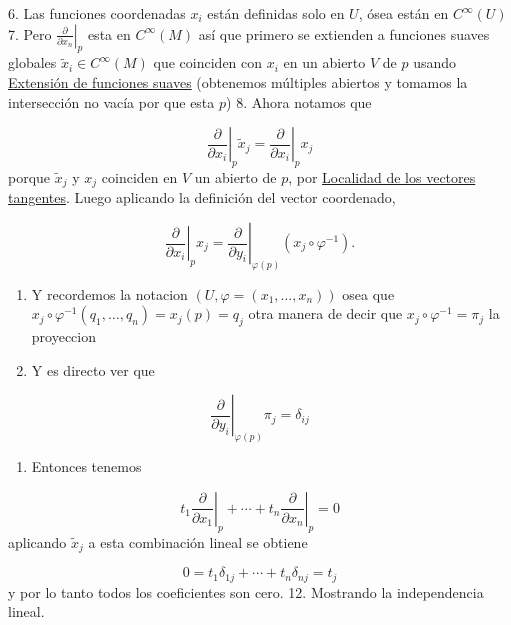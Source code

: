 \begin{bookproof}{}
6. Las funciones coordenadas $x_i$ están definidas solo en $U$, ósea están en $C^{\infty}(U)$ 7. Pero $\left.\frac{\partial}{\partial x_n}\right|_p$ esta en $C^{\infty}(M)$ así que primero se extienden a funciones suaves globales $\widetilde{x}_i\in C^\infty(M)$ que coinciden con $x_i$ en un abierto $V$ de $p$ usando \hyperref[blk:405b16]{Extensión de funciones suaves} (obtenemos múltiples abiertos y tomamos la intersección no vacía por que esta $p$) 8. Ahora notamos que

\[
\left.\frac{\partial}{\partial x_i}\right|_{p}\widetilde{x}_{j}=\left.\frac{\partial}{\partial x_i}\right|_{p}x_{j}
\]
porque $\widetilde{x}_{j}$ y $x_j$ coinciden en $V$ un abierto de $p$, por \hyperref[blk:b713ca]{Localidad de los vectores tangentes}. Luego aplicando la definición del vector coordenado,

\[
\left.\frac{\partial}{\partial x_i}\right|_{p}x_{j}=\left.\frac{\partial}{\partial y_i}\right|_{\varphi(p)}(x_{j}\circ\varphi^{-1}).
\]
\begin{enumerate}[start=9]
\item Y recordemos la notacion $(U,\varphi=(x_{1},\ldots,x_{n}))$ osea que $x_{j}\circ\varphi ^{-1}(q_{1},\ldots,q_{n})=x_{j}(p)=q_{j}$ otra manera de decir que $x_{j}\circ\varphi ^{-1}=\pi_{j}$ la proyeccion
\item Y es directo ver que
\end{enumerate}
\[
\left.\frac{\partial}{\partial y_i}\right|_{\varphi(p)}\pi_{j}=\delta_{ij}
\]
\begin{enumerate}[start=11]
\item Entonces tenemos
\end{enumerate}
\[
t_1\left.\frac{\partial}{\partial x_1}\right|_p+\cdots+t_n\left.\frac{\partial}{\partial x_n}\right|_p=0
\]
aplicando $\widetilde{x}_j$ a esta combinación lineal se obtiene

\[
0=t_1\delta_{1j}+\cdots+t_n\delta_{nj}=t_j
\]
y por lo tanto todos los coeficientes son cero. 12. Mostrando la independencia lineal.

\bookqed
\end{bookproof}
